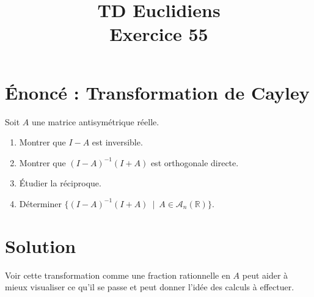 \documentclass[french]{article}
\title{TD Euclidiens\\ Exercice 55}
\date{}
\newcommand{\R}{\mathbb{R}}
\newcommand{\inv}{^{-1}}
\begin{document}
\maketitle

\section{Énoncé : Transformation de Cayley}
Soit $A$ une matrice antisymétrique réelle.
\begin{enumerate}
	\item Montrer que $I-A$ est inversible.
	\item Montrer que $(I-A)\inv(I+A)$ est orthogonale directe.
	\item Étudier la réciproque.
	\item Déterminer $\{(I-A)\inv(I+A)\ \mid\ A\in\mathcal{A}_n(\R)\}$.
\end{enumerate}
\section{Solution}
Voir cette transformation comme une fraction rationnelle en $A$ peut aider à mieux visualiser ce qu'il se passe et peut donner l'idée des calculs à effectuer.
\end{document}
